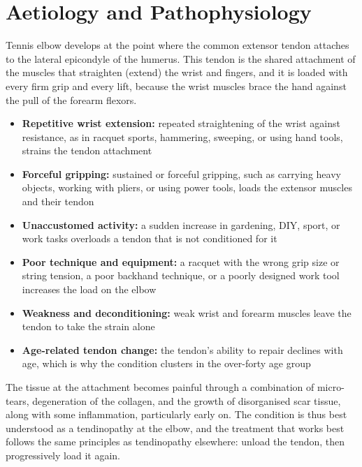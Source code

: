 \section*{Aetiology and Pathophysiology}
Tennis elbow develops at the point where the common extensor tendon attaches to the lateral epicondyle of the humerus. This tendon is the shared attachment of the muscles that straighten (extend) the wrist and fingers, and it is loaded with every firm grip and every lift, because the wrist muscles brace the hand against the pull of the forearm flexors.

\begin{itemize}
    \item \textbf{Repetitive wrist extension:} repeated straightening of the wrist against resistance, as in racquet sports, hammering, sweeping, or using hand tools, strains the tendon attachment
    \item \textbf{Forceful gripping:} sustained or forceful gripping, such as carrying heavy objects, working with pliers, or using power tools, loads the extensor muscles and their tendon
    \item \textbf{Unaccustomed activity:} a sudden increase in gardening, DIY, sport, or work tasks overloads a tendon that is not conditioned for it
    \item \textbf{Poor technique and equipment:} a racquet with the wrong grip size or string tension, a poor backhand technique, or a poorly designed work tool increases the load on the elbow
    \item \textbf{Weakness and deconditioning:} weak wrist and forearm muscles leave the tendon to take the strain alone
    \item \textbf{Age-related tendon change:} the tendon's ability to repair declines with age, which is why the condition clusters in the over-forty age group
\end{itemize}

The tissue at the attachment becomes painful through a combination of micro-tears, degeneration of the collagen, and the growth of disorganised scar tissue, along with some inflammation, particularly early on. The condition is thus best understood as a tendinopathy at the elbow, and the treatment that works best follows the same principles as tendinopathy elsewhere: unload the tendon, then progressively load it again.

